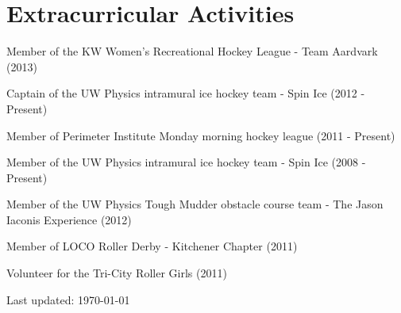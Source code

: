 \documentclass[letterpaper]{article}
\def\footerlink{http://jblevins.org/projects/cv-template/}
\renewenvironment{itemize}{
  \begin{list}{}{
    \setlength{\leftmargin}{1.5em}
  }
}{
  \end{list}
}
\begin{document}
\section*{Extracurricular Activities}

\begin{itemize}

\item Member of the KW Women's Recreational Hockey League - Team Aardvark (2013)
\item Captain of the UW Physics intramural ice hockey team - Spin Ice (2012 - Present)
\item Member of Perimeter Institute Monday morning hockey league (2011 - Present)
\item Member of the UW Physics intramural ice hockey team - Spin Ice (2008 - Present)
\item Member of the UW Physics Tough Mudder obstacle course team - The Jason Iaconis Experience (2012)
\item Member of LOCO Roller Derby - Kitchener Chapter (2011)
\item Volunteer for the Tri-City Roller Girls (2011)

\end{itemize}

\bigskip

\begin{center}
  \begin{footnotesize}
    Last updated: \today \\
  \end{footnotesize}
\end{center}
\end{document}
